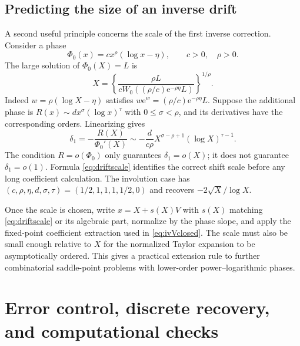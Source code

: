 \documentclass[11pt,a4paper]{article}
\theoremstyle{definition}
\theoremstyle{remark}
\newcommand{\ee}{\mathrm e}
\numberwithin{equation}{section}
\begin{document}
\subsection{Predicting the size of an inverse drift}
A second useful principle concerns the scale of the first inverse correction. Consider a phase
\begin{equation}
 \Phi_0(x)=c x^\rho(\log x-\eta),\qquad c>0,\quad\rho>0.
 \label{eq:powerlogphase}
\end{equation}
The large solution of $\Phi_0(X)=L$ is
\begin{equation}
 X=\left\{\frac{\rho L}{cW_0((\rho/c)\ee^{-\rho\eta}L)}\right\}^{1/\rho}.
 \label{eq:powerlogcore}
\end{equation}
Indeed $w=\rho(\log X-\eta)$ satisfies $w\ee^w=(\rho/c)\ee^{-\rho\eta}L$.
Suppose the additional phase is
$R(x)\sim d x^\sigma(\log x)^\tau$ with $0\le\sigma<\rho$, and its derivatives have the corresponding orders. Linearizing gives
\begin{equation}
 \delta_1=-\frac{R(X)}{\Phi_0'(X)}
 \sim-\frac d{c\rho}X^{\sigma-\rho+1}(\log X)^{\tau-1}.
 \label{eq:driftscale}
\end{equation}
The condition $R=o(\Phi_0)$ only guarantees $\delta_1=o(X)$; it does not guarantee $\delta_1=o(1)$. Formula \eqref{eq:driftscale} identifies the correct shift scale before any long coefficient calculation. The involution case has $(c,\rho,\eta,d,\sigma,\tau)=(1/2,1,1,1,1/2,0)$ and recovers $-2\sqrt X/\log X$.

Once the scale is chosen, write $x=X+s(X)V$ with $s(X)$ matching \eqref{eq:driftscale} or its algebraic part, normalize by the phase slope, and apply the fixed-point coefficient extraction used in \eqref{eq:ivVclosed}. The scale must also be small enough relative to $X$ for the normalized Taylor expansion to be asymptotically ordered. This gives a practical extension rule to further combinatorial saddle-point problems with lower-order power--logarithmic phases.

\section{Error control, discrete recovery, and computational checks}
\label{sec:verification}
\end{document}
